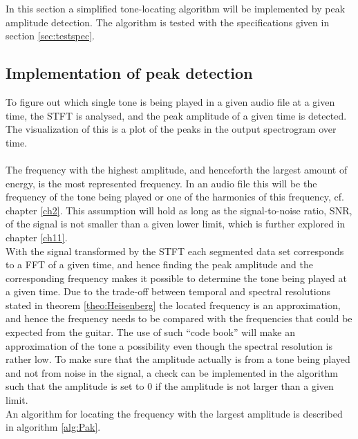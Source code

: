 \label{sec:peak_detection}
In this section a simplified tone-locating algorithm will be implemented by peak amplitude detection.
The algorithm is tested with the specifications given in section \ref{sec:testspec}.
\subsection{Implementation of peak detection}
To figure out which single tone is being played in a given audio file at a given time, the STFT is analysed, and the peak amplitude of a given time is detected.
The visualization of this is a plot of the peaks in the output spectrogram over time.
\\ \\
The frequency with the highest amplitude, and henceforth the largest amount of energy, is the most represented frequency. 
In an audio file this will be the frequency of the tone being played or one of the harmonics of this frequency, cf. chapter \ref{ch2}.
This assumption will hold as long as the signal-to-noise ratio, SNR, of the signal is not smaller than a given lower limit, which is further explored in chapter \ref{ch11}. \\
With the signal transformed by the STFT each segmented data set corresponds to a FFT of a given time, and hence finding the peak amplitude and the corresponding frequency makes it possible to determine the tone being played at a given time. Due to the trade-off between temporal and spectral resolutions stated in theorem \ref{theo:Heisenberg} the located frequency is an approximation, and hence the frequency needs to be compared with the frequencies that could be expected from the guitar.
The use of such ``code book'' will make an approximation of the tone a possibility even though the spectral resolution is rather low.
\newpage
To make sure that the amplitude actually is from a tone being played and not from noise in the signal, a check can be implemented in the algorithm such that the amplitude is set to $0$ if the amplitude is not larger than a given limit. \\
An algorithm for locating the frequency with the largest amplitude is described in algorithm \ref{alg:Pak}.

